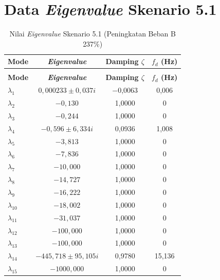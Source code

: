 \section{Data \textit{Eigenvalue} Skenario 5.1}
\begingroup
\fontsize{11}{13.2}\selectfont
\setlength{\tabcolsep}{7pt}
\begin{longtable}{>{\centering\arraybackslash}m{1.5cm} c c c} \caption[]{Nilai
	\textit{Eigenvalue} Skenario 5.1 (Peningkatan Beban B 237\%)}
	\label{tab:eigenvalue_sk51_lampiran} \\
	\toprule
	\textbf{Mode} & \textbf{\textit{Eigenvalue}} & \textbf{Damping $\zeta$} &
	\textbf{$f_d$ (Hz)} \\
	\midrule
	\endfirsthead
	\multicolumn{4}{l}{\textit{(lanjutan)}} \\
	\toprule
	\textbf{Mode} & \textbf{\textit{Eigenvalue}} & \textbf{Damping $\zeta$} &
	\textbf{$f_d$ (Hz)} \\
	\midrule
	\endhead
	\bottomrule
	\endfoot
	$\lambda_1$  & $0{,}000233 \pm 0{,}037i$         & $-$0,0063 & 0,006 \\
	$\lambda_2$  & $-0{,}130$                         & 1,0000 & 0 \\
	$\lambda_3$  & $-0{,}244$                         & 1,0000 & 0 \\
	$\lambda_4$  & $-0{,}596 \pm 6{,}334i$            & 0,0936 & 1,008 \\
	$\lambda_5$  & $-3{,}813$                         & 1,0000 & 0 \\
	$\lambda_6$  & $-7{,}836$                         & 1,0000 & 0 \\
	$\lambda_7$  & $-10{,}000$                        & 1,0000 & 0 \\
	$\lambda_8$  & $-14{,}727$                        & 1,0000 & 0 \\
	$\lambda_9$  & $-16{,}222$                        & 1,0000 & 0 \\
	$\lambda_{10}$ & $-18{,}002$                      & 1,0000 & 0 \\
	$\lambda_{11}$ & $-31{,}037$                      & 1,0000 & 0 \\
	$\lambda_{12}$ & $-100{,}000$                     & 1,0000 & 0 \\
	$\lambda_{13}$ & $-100{,}000$                     & 1,0000 & 0 \\
	$\lambda_{14}$ & $-445{,}718 \pm 95{,}105i$       & 0,9780 & 15,136 \\
	$\lambda_{15}$ & $-1000{,}000$                    & 1,0000 & 0 \\
\end{longtable}
\par
\endgroup

